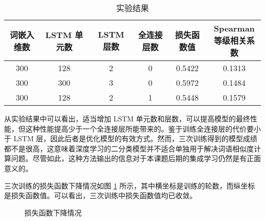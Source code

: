 \begin{table}[h]
	\caption{实验结果}
	\label{t:classifer result}
	\vspace{0.5em}\centering\wuhao
	\begin{tabular}{cccccc}
		\toprule[1.5pt]
		词嵌入维数 & LSTM 单元数 & LSTM 层数 & 全连接层数 & 损失函数值 & \makecell{Spearman \\ 等级相关系数} \\
		\midrule[1pt]
		300 & 128 & 2 & 0 & 0.5422 & 0.1313 \\
		300 & 300 & 3 & 0 & 0.5972 & 0.1484 \\
		300 & 128 & 2 & 1 & 0.5448 & 0.1579 \\
		\bottomrule[1.5pt]
	\end{tabular}
\end{table}

从实验结果中可以看出，适当增加 LSTM 单元数和层数，可以提高模型的最终性能，但这种性能提高少于一个全连接层所能带来的。鉴于训练全连接层的代价要小于 LSTM 层，因此后者是优化模型的有效方式。然而，三次训练得到的模型成绩都不是很高，这意味着深度学习的二分类模型并不适合单独用于解决词语相似度计算问题。尽管如此，这种方法输出的信息对于本课题后期的集成学习仍然是有正面意义的。

三次训练的损失函数下降情况如图 \ref{f:classifer loss} 所示，其中横坐标是训练的轮数，而纵坐标是损失函数值。可以看出，三次训练中损失函数值均已收敛。

\begin{figure}[h]
	\centering
	\caption{损失函数下降情况}
	\label{f:classifer loss}
	\vspace{-1em}
\end{figure}